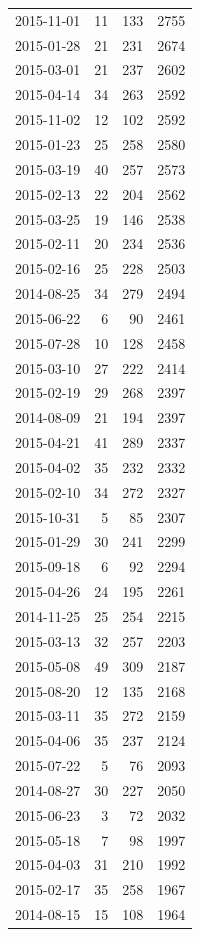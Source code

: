 \begin{tabular}{lrrr}
2015-11-01 & 11 & 133 & 2755 \\
2015-01-28 & 21 & 231 & 2674 \\
2015-03-01 & 21 & 237 & 2602 \\
2015-04-14 & 34 & 263 & 2592 \\
2015-11-02 & 12 & 102 & 2592 \\
2015-01-23 & 25 & 258 & 2580 \\
2015-03-19 & 40 & 257 & 2573 \\
2015-02-13 & 22 & 204 & 2562 \\
2015-03-25 & 19 & 146 & 2538 \\
2015-02-11 & 20 & 234 & 2536 \\
2015-02-16 & 25 & 228 & 2503 \\
2014-08-25 & 34 & 279 & 2494 \\
2015-06-22 & 6 & 90 & 2461 \\
2015-07-28 & 10 & 128 & 2458 \\
2015-03-10 & 27 & 222 & 2414 \\
2015-02-19 & 29 & 268 & 2397 \\
2014-08-09 & 21 & 194 & 2397 \\
2015-04-21 & 41 & 289 & 2337 \\
2015-04-02 & 35 & 232 & 2332 \\
2015-02-10 & 34 & 272 & 2327 \\
2015-10-31 & 5 & 85 & 2307 \\
2015-01-29 & 30 & 241 & 2299 \\
2015-09-18 & 6 & 92 & 2294 \\
2015-04-26 & 24 & 195 & 2261 \\
2014-11-25 & 25 & 254 & 2215 \\
2015-03-13 & 32 & 257 & 2203 \\
2015-05-08 & 49 & 309 & 2187 \\
2015-08-20 & 12 & 135 & 2168 \\
2015-03-11 & 35 & 272 & 2159 \\
2015-04-06 & 35 & 237 & 2124 \\
2015-07-22 & 5 & 76 & 2093 \\
2014-08-27 & 30 & 227 & 2050 \\
2015-06-23 & 3 & 72 & 2032 \\
2015-05-18 & 7 & 98 & 1997 \\
2015-04-03 & 31 & 210 & 1992 \\
2015-02-17 & 35 & 258 & 1967 \\
2014-08-15 & 15 & 108 & 1964 \\

\end{tabular}
